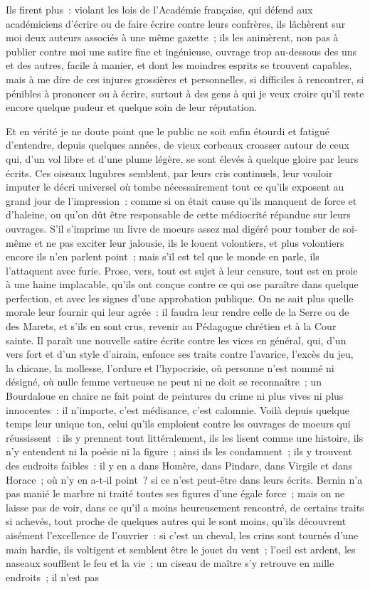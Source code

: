 \documentclass[french,twoside]{book} %
\begin{document}
Ils firent plus : violant les lois de l’Académie française, qui défend aux académiciens d’écrire ou de faire écrire contre leurs confrères, ils lâchèrent sur moi deux auteurs associés à une même gazette ; ils les animèrent, non pas à publier contre moi une satire fine et ingénieuse, ouvrage trop au-dessous des uns et des autres, facile à manier, et dont les moindres esprits se trouvent capables, mais à me dire de ces injures grossières et personnelles, si difficiles à rencontrer, si pénibles à prononcer ou à écrire, surtout à des gens à qui je veux croire qu’il reste encore quelque pudeur et quelque soin de leur réputation.\par
Et en vérité je ne doute point que le public ne soit enfin étourdi et fatigué d’entendre, depuis quelques années, de vieux corbeaux croasser autour de ceux qui, d’un vol libre et d’une plume légère, se sont élevés à quelque gloire par leurs écrits. Ces oiseaux lugubres semblent, par leurs cris continuels, leur vouloir imputer le décri universel où tombe nécessairement tout ce qu’ils exposent au grand jour de l’impression : comme si on était cause qu’ils manquent de force et d’haleine, ou qu’on dût être responsable de cette médiocrité répandue sur leurs ouvrages. S'il s’imprime un livre de moeurs assez mal digéré pour tomber de soi-même et ne pas exciter leur jalousie, ils le louent volontiers, et plus volontiers encore ils n’en parlent point ; mais s’il est tel que le monde en parle, ils l’attaquent avec furie. Prose, vers, tout est sujet à leur censure, tout est en proie à une haine implacable, qu’ils ont conçue contre ce qui ose paraître dans quelque perfection, et avec les signes d’une approbation publique. On ne sait plus quelle morale leur fournir qui leur agrée : il faudra leur rendre celle de la Serre ou de des Marets, et s’ils en sont crus, revenir au Pédagogue chrétien et à la Cour sainte. Il paraît une nouvelle satire écrite contre les vices en général, qui, d’un vers fort et d’un style d’airain, enfonce ses traits contre l’avarice, l’excès du jeu, la chicane, la mollesse, l’ordure et l’hypocrisie, où personne n’est nommé ni désigné, où nulle femme vertueuse ne peut ni ne doit se reconnaître ; un Bourdaloue en chaire ne fait point de peintures du crime ni plus vives ni plus innocentes : il n’importe, c’est médisance, c’est calomnie. Voilà depuis quelque temps leur unique ton, celui qu’ils emploient contre les ouvrages de moeurs qui réussissent : ils y prennent tout littéralement, ils les lisent comme une histoire, ils n’y entendent ni la poésie ni la figure ; ainsi ils les condamnent ; ils y trouvent des endroits faibles : il y en a dans Homère, dans Pindare, dans Virgile et dans Horace ; où n’y en a-t-il point ? si ce n’est peut-être dans leurs écrits. Bernin n’a pas manié le marbre ni traité toutes ses figures d’une égale force ; mais on ne laisse pas de voir, dans ce qu’il a moins heureusement rencontré, de certains traits si achevés, tout proche de quelques autres qui le sont moins, qu’ils découvrent aisément l’excellence de l’ouvrier : si c’est un cheval, les crins sont tournés d’une main hardie, ils voltigent et semblent être le jouet du vent ; l’oeil est ardent, les naseaux soufflent le feu et la vie ; un ciseau de maître s’y retrouve en mille endroits ; il n’est pas 
\end{document}
